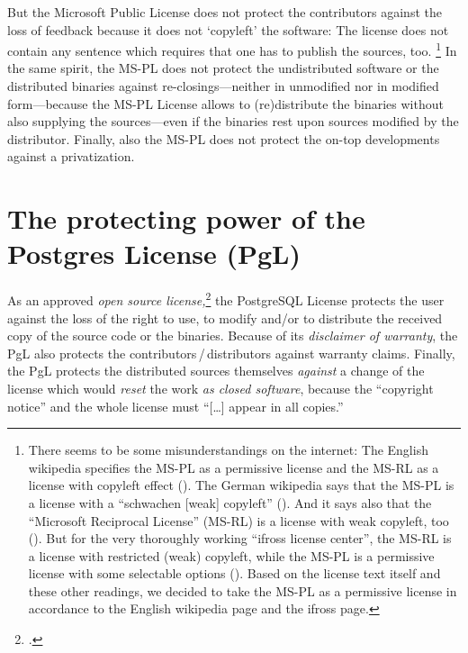 But the Microsoft Public License does not protect the contributors against the
loss of feedback because it does not `copyleft' the software: The license does
not contain any sentence which requires that one has to publish the sources,
too.%
  \footnote{There seems to be some misunderstandings on the internet: The
  English wikipedia specifies the MS-PL as a permissive license and the MS-RL as
  a license with copyleft effect (\cite[cf.][\nopage wp]{wpMsSharedSources2013a}).
  The German wikipedia says that the MS-PL is a license with a \enquote{schwachen
  [weak] copyleft} (\cite[cf.][\nopage wp]{wpMspl2013a}). And it says also that
  the \enquote{Microsoft Reciprocal License} (MS-RL) is a license with weak
  copyleft, too (\cite[cf.][\nopage wp]{wpMsrl2013a}). But for the very
  thoroughly working \enquote{ifross license center}, the MS-RL is a license
  with restricted (weak) copyleft, while the MS-PL is a permissive license with
  some selectable options (\cite[cf.][\nopage wp]{ifross2011a}). Based on the
  license text itself and these other readings, we decided to take the MS-PL as
  a permissive license in accordance to the English wikipedia page and the
  ifross page.}
In the same spirit, the MS-PL does not protect the undistributed
software or the distributed binaries against re-closings---neither in
unmodified nor in modified form---because the MS-PL License allows to
(re)distribute the binaries without also supplying the sources---even if the
binaries rest upon sources modified by the distributor. Finally, also the MS-PL
does not protect the on-top developments against a privatization.


\section{\texorpdfstring{The protecting power of the}{The} Postgres License (PgL)}

As an approved \emph{open source license,}\footcite[cf.][\nopage wp]{OSI2012b}
the PostgreSQL License protects the user against the loss of the right to use,
to modify and/or to distribute the received copy of the source code or the
binaries.\citePGL{}
Because of its \emph{disclaimer of warranty}, the PgL also protects the
contributors\,/\,distributors against warranty claims.\citePGL{} Finally, the
PgL protects the distributed sources themselves \emph{against} a change of the
license which would \emph{reset} the work \emph{as closed software}, because the
\enquote{copyright notice} and the whole license must \enquote{[\ldots] appear
in all copies.}\citePGL{}

